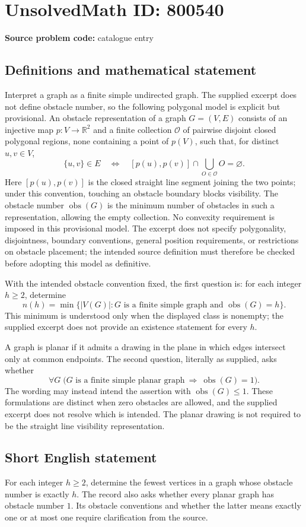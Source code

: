 \documentclass[11pt]{article}
\newcommand{\R}{\mathbb{R}}
\begin{document}
\section*{UnsolvedMath ID: 800540}
\textbf{Source problem code:} catalogue entry
\subsection{Definitions and mathematical statement}
Interpret a graph as a finite simple undirected graph. The supplied excerpt does not define obstacle number, so the following polygonal model is explicit but provisional. An obstacle representation of a graph \(G=(V,E)\) consists of an injective map \(p:V\to\R^2\) and a finite collection \(\mathcal O\) of pairwise disjoint closed polygonal regions, none containing a point of \(p(V)\), such that, for distinct \(u,v\in V\),
\[
\{u,v\}\in E
\quad\Longleftrightarrow\quad
[p(u),p(v)]\cap\bigcup_{O\in\mathcal O}O=\varnothing.
\]
Here \([p(u),p(v)]\) is the closed straight line segment joining the two points; under this convention, touching an obstacle boundary blocks visibility. The obstacle number \(\operatorname{obs}(G)\) is the minimum number of obstacles in such a representation, allowing the empty collection. No convexity requirement is imposed in this provisional model. The excerpt does not specify polygonality, disjointness, boundary conventions, general position requirements, or restrictions on obstacle placement; the intended source definition must therefore be checked before adopting this model as definitive.

With the intended obstacle convention fixed, the first question is: for each integer \(h\ge 2\), determine
\[
n(h)=\min\bigl\{|V(G)|:G\text{ is a finite simple graph and }\operatorname{obs}(G)=h\bigr\}.
\]
This minimum is understood only when the displayed class is nonempty; the supplied excerpt does not provide an existence statement for every \(h\).

A graph is planar if it admits a drawing in the plane in which edges intersect only at common endpoints. The second question, literally as supplied, asks whether
\[
\forall G\;\bigl(G\text{ is a finite simple planar graph}\ \Longrightarrow\ \operatorname{obs}(G)=1\bigr).
\]
The wording may instead intend the assertion with \(\operatorname{obs}(G)\le 1\). These formulations are distinct when zero obstacles are allowed, and the supplied excerpt does not resolve which is intended. The planar drawing is not required to be the straight line visibility representation.
\subsection{Short English statement}
For each integer \(h\ge 2\), determine the fewest vertices in a graph whose obstacle number is exactly \(h\). The record also asks whether every planar graph has obstacle number \(1\). Its obstacle conventions and whether the latter means exactly one or at most one require clarification from the source.
\end{document}
